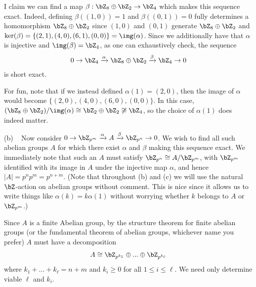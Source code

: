 \begin{homework}[e]
\begin{prf}
    I claim we can find a map $\beta:\bZ_8\oplus \bZ_2 \to \bZ_4$ which makes this sequence exact. Indeed, defining $\beta((1,0)) = 1$ and $\beta((0,1)) = 0$ fully determines a homomorphism $\bZ_8\oplus \bZ_2$ since $(1,0)$ and $(0,1)$ generate $\bZ_8\oplus \bZ_2$ and $\ker(\beta) = \{(2,1), (4,0),(6,1),(0,0)\} = \img(\alpha)$. Since we additionally have that $\alpha$ is injective and $\img(\beta) = \bZ_4$, as one can exhaustively check, the sequence
    \begin{align*}
      0 \to \bZ_4 \xrightarrow{\alpha} \bZ_8 \oplus \bZ_2 \xrightarrow{\beta} \bZ_4 \to 0
    \end{align*}
    is short exact.

    For fun, note that if we instead defined $\alpha(1) = (2,0)$, then the image of $\alpha$ would become $\{(2,0),(4,0),(6,0),(0,0)\}$. In this case, $(\bZ_8 \oplus \bZ_2)/\img(\alpha) \cong \bZ_2 \oplus \bZ_2 \not\cong \bZ_4$, so the choice of $\alpha(1)$ does indeed matter.

    \bigskip

    (b) ~ Now consider $0 \to \bZ_{p^m}\xrightarrow{\alpha} A \xrightarrow{\beta}\bZ_{p^n}\to 0$. We wish to find all such abelian groups $A$ for which there exist $\alpha$ and $\beta$ making this sequence exact. We immediately note that such an $A$ must satisfy $\bZ_{p^n}\cong A/\bZ_{p^m}$, with $\bZ_{p^m}$ identified with its image in $A$ under the injective map $\alpha$, and hence $|A| = p^np^m = p^{n+m}$. (Note that throughout (b) and (c) we will use the natural $\bZ$-action on abelian groups without comment. This is nice since it allows us to write things like $\alpha(k) = k\alpha(1)$ without worrying whether $k$ belongs to $A$ or $\bZ_{p^m}$.)

    Since $A$ is a finite Abelian group, by the structure theorem for finite abelian groups (or the fundamental theorem of abelian groups, whichever name you prefer) $A$ must have a decomposition
    \begin{align*}
      A \cong \bZ_{p^{k_1}} \oplus ... \oplus \bZ_{p^{k_\ell}}
    \end{align*}
    where $k_1 + ... + k_\ell = n+m$ and $k_i \geq 0$ for all $1\leq i\leq \ell$. We need only determine viable $\ell$ and $k_i$.


\end{prf}
\end{homework}
